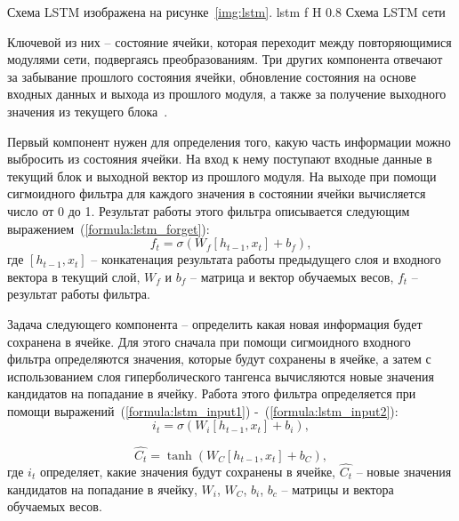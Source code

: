 Схема LSTM изображена на рисунке~\ref{img:lstm}.
{lstm} %
{f} %
{H} %
{0.8\textwidth} %
{Схема LSTM сети} %

Ключевой из них -- состояние ячейки, которая переходит между повторяющимися модулями сети, подвергаясь преобразованиям.
Три других компонента отвечают за забывание прошлого состояния ячейки, обновление состояния на основе входных данных и выхода из прошлого модуля, а также за получение выходного значения из текущего блока~\cite{al2024rnn}.

Первый компонент нужен для определения того, какую часть информации можно выбросить из состояния ячейки.
На вход к нему поступают входные данные в текущий блок и выходной вектор из прошлого модуля.
На выходе при помощи сигмоидного фильтра для каждого значения в состоянии ячейки вычисляется число от 0 до 1.
Результат работы этого фильтра описывается следующим выражением~(\ref{formula:lstm_forget}):
\begin{equation}\label{formula:lstm_forget}
	f_t = \sigma(W_f[h_{t-1}, x_t] + b_f),
\end{equation}
где $[h_{t-1}, x_t]$ -- конкатенация результата работы предыдущего слоя и входного вектора в текущий слой, $W_f$ и $b_f$ -- матрица и вектор обучаемых весов, $f_t$ -- результат работы фильтра.

Задача следующего компонента -- определить какая новая информация будет сохранена в ячейке.
Для этого сначала при помощи сигмоидного входного фильтра определяются значения, которые будут сохранены в ячейке, а затем с использованием слоя гиперболического тангенса вычисляются новые значения кандидатов на попадание в ячейку.
Работа этого фильтра определяется при помощи выражений~(\ref{formula:lstm_input1}) -~(\ref{formula:lstm_input2}):
\begin{equation}\label{formula:lstm_input1}
	i_t = \sigma(W_i[h_{t-1}, x_t] + b_i),
\end{equation}

\begin{equation}\label{formula:lstm_input2}
	\hat{C_t} = \tanh(W_C[h_{t-1}, x_t] + b_C),
\end{equation}
где $i_t$ определяет, какие значения будут сохранены в ячейке, $\hat{C_t}$ -- новые значения кандидатов на попадание в ячейку, $W_i$, $W_C$, $b_i$, $b_c$ -- матрицы и вектора обучаемых весов.

